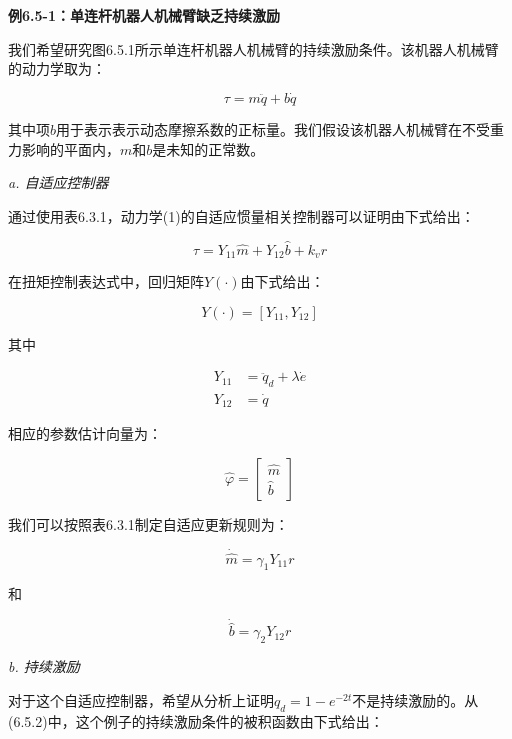 \documentclass[12pt,a4paper]{ctexart}
\begin{document}
\textbf{例6.5-1：单连杆机器人机械臂缺乏持续激励}

我们希望研究图6.5.1所示单连杆机器人机械臂的持续激励条件。该机器人机械臂的动力学取为：

\begin{equation}
\tau = m\ddot{q} + b\dot{q}
\end{equation}

其中项$b$用于表示表示动态摩擦系数的正标量。我们假设该机器人机械臂在不受重力影响的平面内，$m$和$b$是未知的正常数。

\textit{a. 自适应控制器}

通过使用表6.3.1，动力学(1)的自适应惯量相关控制器可以证明由下式给出：

\begin{equation}
\tau = Y_{11}\hat{m} + Y_{12}\hat{b} + k_v r
\end{equation}

在扭矩控制表达式中，回归矩阵$Y(\cdot)$由下式给出：

\begin{equation}
Y(\cdot) = [Y_{11}, Y_{12}]
\end{equation}

其中

\begin{align}
Y_{11} &= \ddot{q}_d + \lambda \dot{e} \\
Y_{12} &= \dot{q}
\end{align}

相应的参数估计向量为：

\begin{equation}
\hat{\varphi} = \begin{bmatrix} \hat{m} \\ \hat{b} \end{bmatrix}
\end{equation}

我们可以按照表6.3.1制定自适应更新规则为：

\begin{equation}
\dot{\hat{m}} = \gamma_1 Y_{11} r
\end{equation}

和

\begin{equation}
\dot{\hat{b}} = \gamma_2 Y_{12} r
\end{equation}

\textit{b. 持续激励}

对于这个自适应控制器，希望从分析上证明$q_d = 1 - e^{-2t}$不是持续激励的。从(6.5.2)中，这个例子的持续激励条件的被积函数由下式给出：
\end{document}
